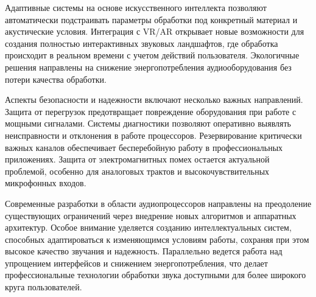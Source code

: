 Адаптивные системы на основе искусственного интеллекта позволяют автоматически подстраивать параметры обработки под конкретный материал и акустические условия. Интеграция с VR/AR открывает новые возможности для создания полностью интерактивных звуковых ландшафтов, где обработка происходит в реальном времени с учетом действий пользователя. Экологичные решения направлены на снижение энергопотребления аудиооборудования без потери качества обработки.

Аспекты безопасности и надежности включают несколько важных направлений. Защита от перегрузок предотвращает повреждение оборудования при работе с мощными сигналами. Системы диагностики позволяют оперативно выявлять неисправности и отклонения в работе процессоров. Резервирование критически важных каналов обеспечивает бесперебойную работу в профессиональных приложениях. Защита от электромагнитных помех остается актуальной проблемой, особенно для аналоговых трактов и высокочувствительных микрофонных входов.

Современные разработки в области аудиопроцессоров направлены на преодоление существующих ограничений через внедрение новых алгоритмов и аппаратных архитектур. Особое внимание уделяется созданию интеллектуальных систем, способных адаптироваться к изменяющимся условиям работы, сохраняя при этом высокое качество звучания и надежность. Параллельно ведется работа над упрощением интерфейсов и снижением энергопотребления, что делает профессиональные технологии обработки звука доступными для более широкого круга пользователей.


